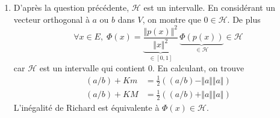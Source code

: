 \begin{enumerate}
\item D'après la question précédente, $\mathcal{H}$ est un intervalle. En considérant un vecteur orthogonal à $a$ ou $b$ dans $V$, on montre que $0 \in \mathcal{H}$.  De plus
\begin{displaymath}
\forall x \in E, \; \Phi(x) = \underset{\in [0,1]}{\underbrace{\frac{\Vert p(x)\Vert^2}{\Vert x\Vert^2}}}\,\underset{\in \mathcal{H}}{\underbrace{\Phi(p(x))}} \in \mathcal{H}  
\end{displaymath}
car $\mathcal{H}$ est un intervalle qui contient $0$.\newline
En calculant, on trouve
\begin{align*}
 (a/b) + Km &= \frac{1}{2}\left((a/b) - \Vert a \Vert \Vert a \Vert\right)\\ 
 (a/b) + KM &= \frac{1}{2}\left((a/b) + \Vert a \Vert \Vert a \Vert\right)
\end{align*}
L'inégalité de Richard est équivalente à $\Phi(x) \in \mathcal{H}$.

\end{enumerate}
